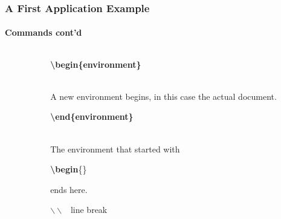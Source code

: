\begin{frame}
\frametitle{A First Application Example}
\framesubtitle{Commands cont'd}
\begin{columns}
\begin{column}{0.6\textwidth}
\begin{ttfamily}\scriptsize

 \normalsize
\end{ttfamily}
\end{column}
\begin{column}{0.4\textwidth}
\begin{ttfamily}\textbf{\color{unibablueI}\textbackslash begin\color{black}\{environment\}}\end{ttfamily}\\
A new environment begins, in this case the actual document.\\[5mm]

\begin{ttfamily}\textbf{\color{unibablueI}\textbackslash end\color{black}\{environment\}}\end{ttfamily}\\
The environment that started with \begin{ttfamily}\textbf{\color{unibablueI}\textbackslash begin}\color{black}\{\}\end{ttfamily}
ends here.\\[5mm]

\begin{ttfamily}\textbf{\color{nounibaredII}$\backslash\backslash$}\color{black}
~line break\end{ttfamily}\\
\end{column}
\end{columns}
\end{frame}



